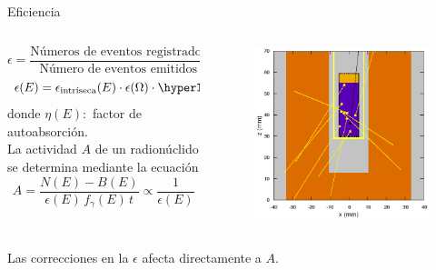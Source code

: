 \documentclass[9pt]{beamer}
\begin{document}
\begin{frame}{Eficiencia}
	\begin{columns}
		\begin{column}{0.53\textwidth}
			\justifying
			\begin{equation}
				\epsilon = \dfrac{\text{Números de eventos registrados}}{\text{Número de eventos emitidos}},
			\end{equation}
			\begin{equation}
				\epsilon(E) = \epsilon_{\text{intríseca}}(E)\cdot \epsilon(\Omega)\cdot\text{\hyperlink{TCSC}{\beamerbutton{TCSC}}}\cdot \eta(E), 
			\end{equation}
			donde $\eta(E):$ factor de autoabsorción.
			\\ \vspace{0.5cm}
			La actividad $A$ de un radionúclido se determina mediante la ecuación\footnotemark[1]
			\begin{equation}
				A = \dfrac{N(E) - B(E)}{\epsilon(E)\,f_\gamma(E)\,t} \propto \dfrac{1}{\epsilon(E)}
			\end{equation}
		\end{column}
		\begin{column}{0.45\textwidth}  
			\justifying
			\begin{figure}
			\includegraphics[width=1\textwidth]{Imagenes/ZY-2.png}
			\end{figure}
		\end{column}
	\end{columns}
\begin{center}
Las correcciones en la $\epsilon$ afecta directamente a $A$.	
\end{center}
\end{frame}
\end{document}
